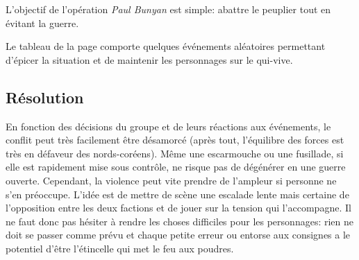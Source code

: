 L'objectif de l'opération \emph{Paul Bunyan} est simple: abattre le peuplier tout en évitant la guerre.

Le tableau de la page \pageref{table:peuplier} comporte quelques événements aléatoires permettant d'épicer la situation et de maintenir les personnages sur le qui-vive.

\subsection{Résolution}

En fonction des décisions du groupe et de leurs réactions aux événements, le conflit peut très facilement être désamorcé (après tout, l'équilibre des forces est très en défaveur des nords-coréens).
Même une escarmouche ou une fusillade, si elle est rapidement mise sous contrôle, ne risque pas de dégénérer en une guerre ouverte.
Cependant, la violence peut vite prendre de l'ampleur si personne ne s'en préoccupe.
L'idée est de mettre de scène une escalade lente mais certaine de l'opposition entre les deux factions et de jouer sur la tension qui l'accompagne.
Il ne faut donc pas hésiter à rendre les choses difficiles pour les personnages: rien ne doit se passer comme prévu et chaque petite erreur ou entorse aux consignes a le potentiel d'être l'étincelle qui met le feu aux poudres.

